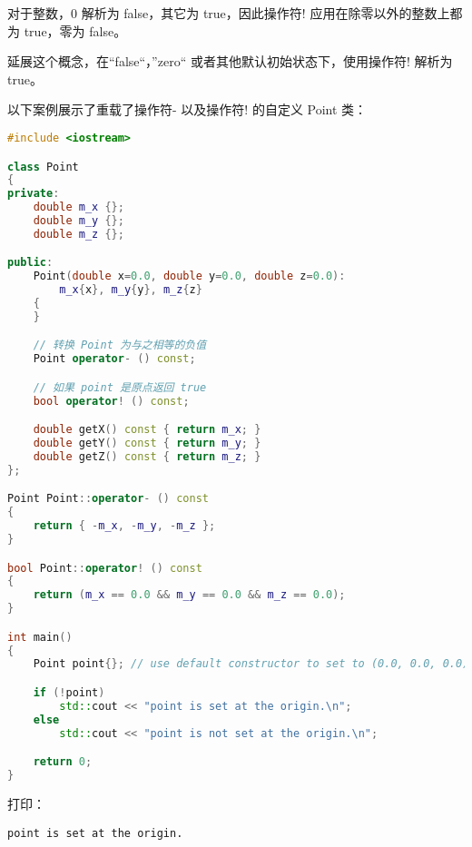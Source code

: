 \documentclass[../../LearnCpp.tex]{subfiles}
\begin{document}
对于整数，0 解析为 false，其它为 true，因此操作符! 应用在除零以外的整数上都为 true，零为 false。

延展这个概念，在“false“，”zero“ 或者其他默认初始状态下，使用操作符! 解析为 true。

以下案例展示了重载了操作符- 以及操作符! 的自定义 Point 类：

\begin{lstlisting}[language=C++]
#include <iostream>

class Point
{
private:
    double m_x {};
    double m_y {};
    double m_z {};

public:
    Point(double x=0.0, double y=0.0, double z=0.0):
        m_x{x}, m_y{y}, m_z{z}
    {
    }

    // 转换 Point 为与之相等的负值
    Point operator- () const;

    // 如果 point 是原点返回 true
    bool operator! () const;

    double getX() const { return m_x; }
    double getY() const { return m_y; }
    double getZ() const { return m_z; }
};

Point Point::operator- () const
{
    return { -m_x, -m_y, -m_z };
}

bool Point::operator! () const
{
    return (m_x == 0.0 && m_y == 0.0 && m_z == 0.0);
}

int main()
{
    Point point{}; // use default constructor to set to (0.0, 0.0, 0.0)

    if (!point)
        std::cout << "point is set at the origin.\n";
    else
        std::cout << "point is not set at the origin.\n";

    return 0;
}
\end{lstlisting}

打印：

\begin{lstlisting}
point is set at the origin.
\end{lstlisting}
\end{document}
